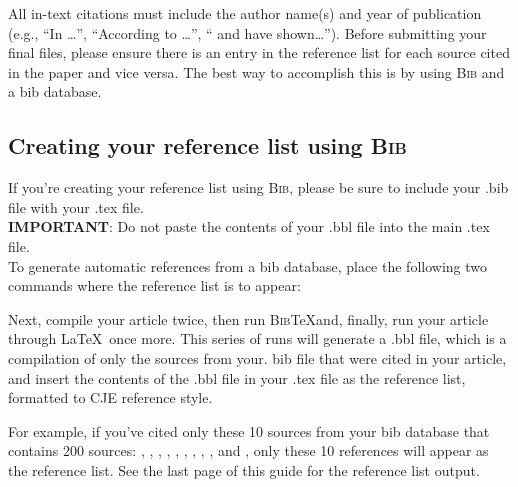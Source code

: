 \documentclass{cje}          %
\theoremstyle{plain}%
\theoremstyle{definition}
\theoremstyle{remark}
\begin{document}
All in-text citations must include the author name(s) and year of publication (e.g., ``In \cite{Lucas90}\ldots'',  ``According to \cite{Van-Zon}\ldots'', ``\cite{Mas-Colell} and \cite{Glomm92} have shown\ldots''). Before submitting your final files, please ensure there is an entry in the reference list for each source cited in the paper and vice versa. The best way to accomplish this is by using \textsc{Bib}\upshape{\TeX} and a bib database.

\subsection{Creating your reference list using \textsc{Bib}\upshape{\TeX}}

If you're creating your reference list using \textsc{Bib}\upshape{\TeX}, please be sure to include your .bib file with your .tex file. \\

\noindent \textbf{IMPORTANT}: Do not paste the contents of your .bbl file into the main .tex file.\\


 To generate automatic references from a bib database, place the following two commands where the reference list is to appear:
\begin{smallverbatim}
\end{smallverbatim}
%
Next, compile your article twice, then run \textsc{Bib}\TeX and, finally,   run your article through \LaTeX\ once more. This series of runs will generate a .bbl file, which is a compilation of only the sources from your. bib file that were cited in your article, and insert the contents of the .bbl file in your .tex file as the reference list, formatted to CJE reference style.

For example, if you've cited only these 10 sources from your bib database that contains 200 sources: 
\cite{Glomm92},
\cite{Mas-Colell},
\cite{Atkinson},
\cite{Van-Zon},
\cite{Danzon},
\cite{vanderPolGairns2000},
\cite{Lucas90},
\cite{Mendoza1991}, 
\cite{Glomm97},
\cite{Aisa04} and
\cite{LiSK12}, 
only these 10 references will appear as the reference list. See the last page of this guide for the reference list output.
\end{document}
